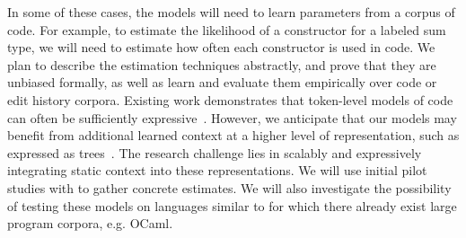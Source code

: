 In some of these cases, the models will need to learn parameters from a corpus
of code. For example, to estimate the likelihood of a constructor for a labeled
sum type, we will need to estimate how often each constructor is used in
code. We plan to describe the estimation techniques abstractly, and prove that
they are unbiased formally, as well as learn and evaluate them empirically over code or edit
history corpora.  Existing work demonstrates that token-level models of code can
often be sufficiently
expressive~\citep{buggy-naturalness-icse16,icse-naturalness12}. However, we
anticipate that our models may benefit from additional learned context at a
higher level of representation, such as expressed as
trees~\citep{changedistiller,probabilistic-cfgs}.  The research challenge lies in
scalably and expressively integrating static context into these
representations. We will use initial pilot studies with 
\HazelEnv to gather concrete estimates. We will also investigate the possibility
of testing these models on languages similar to \HazelEnv for which there
already exist large program corpora, e.g. OCaml.

